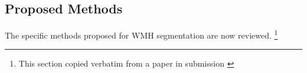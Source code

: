 \subsection{Proposed Methods}\label{ss:priorproposed}
The specific methods proposed for WMH segmentation are now reviewed.%
\footnote{This section copied verbatim from a paper in submission \cite{Knight2017a}}
\newcommand{\priorworksub}[1]{\subsubsection{#1}}

